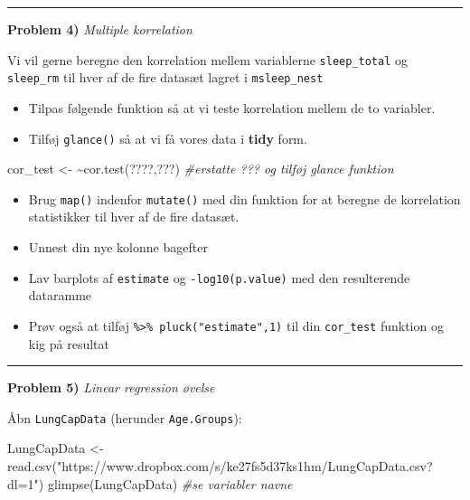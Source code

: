 \documentclass[
]{book}
\newenvironment{Shaded}{\begin{snugshade}}{\end{snugshade}}
\newcommand{\CommentTok}[1]{\textcolor[rgb]{0.56,0.35,0.01}{\textit{#1}}}
\newcommand{\ErrorTok}[1]{\textcolor[rgb]{0.64,0.00,0.00}{\textbf{#1}}}
\newcommand{\FunctionTok}[1]{\textcolor[rgb]{0.00,0.00,0.00}{#1}}
\newcommand{\NormalTok}[1]{#1}
\newcommand{\OtherTok}[1]{\textcolor[rgb]{0.56,0.35,0.01}{#1}}
\newcommand{\StringTok}[1]{\textcolor[rgb]{0.31,0.60,0.02}{#1}}
\providecommand{\tightlist}{%
  \setlength{\itemsep}{0pt}\setlength{\parskip}{0pt}}
\begin{document}
\begin{center}\rule{0.5\linewidth}{0.5pt}\end{center}

\textbf{Problem 4)} \emph{Multiple korrelation}

Vi vil gerne beregne den korrelation mellem variablerne \texttt{sleep\_total} og \texttt{sleep\_rm} til hver af de fire datasæt lagret i \texttt{msleep\_nest}

\begin{itemize}
\tightlist
\item
  Tilpas følgende funktion så at vi teste korrelation mellem de to variabler.
\item
  Tilføj \texttt{glance()} så at vi få vores data i \textbf{tidy} form.
\end{itemize}

\begin{Shaded}
\begin{Highlighting}[]
\NormalTok{cor\_test }\OtherTok{\textless{}{-}} \ErrorTok{\textasciitilde{}}\FunctionTok{cor.test}\NormalTok{(????,???) }\CommentTok{\#erstatte ??? og tilføj glance funktion}
\end{Highlighting}
\end{Shaded}

\begin{itemize}
\item
  Brug \texttt{map()} indenfor \texttt{mutate()} med din funktion for at beregne de korrelation statistikker til hver af de fire datasæt.
\item
  Unnest din nye kolonne bagefter
\item
  Lav barplots af \texttt{estimate} og \texttt{-log10(p.value)} med den resulterende dataramme
\item
  Prøv også at tilføj \texttt{\%\textgreater{}\%\ pluck("estimate",1)} til din \texttt{cor\_test} funktion og kig på resultat
\end{itemize}

\begin{center}\rule{0.5\linewidth}{0.5pt}\end{center}

\textbf{Problem 5)} \emph{Linear regression øvelse}

Åbn \texttt{LungCapData} (herunder \texttt{Age.Groups}):

\begin{Shaded}
\begin{Highlighting}[]
\NormalTok{LungCapData }\OtherTok{\textless{}{-}} \FunctionTok{read.csv}\NormalTok{(}\StringTok{"https://www.dropbox.com/s/ke27fs5d37ks1hm/LungCapData.csv?dl=1"}\NormalTok{)}
\FunctionTok{glimpse}\NormalTok{(LungCapData) }\CommentTok{\#se variabler navne}
\end{Highlighting}
\end{Shaded}
\end{document}

